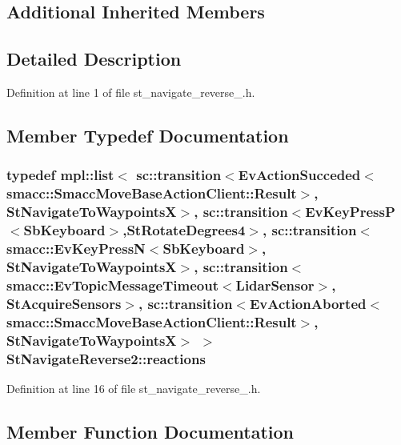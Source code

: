\subsection*{Additional Inherited Members}


\subsection{Detailed Description}


Definition at line 1 of file st\+\_\+navigate\+\_\+reverse\+\_.\+h.



\subsection{Member Typedef Documentation}
\subsubsection[{\texorpdfstring{reactions}{reactions}}]{\setlength{\rightskip}{0pt plus 5cm}typedef mpl\+::list$<$ sc\+::transition$<$Ev\+Action\+Succeded$<$smacc\+::\+Smacc\+Move\+Base\+Action\+Client\+::\+Result$>$, {\bf St\+Navigate\+To\+WaypointsX}$>$, sc\+::transition$<$Ev\+Key\+PressP$<$Sb\+Keyboard$>$,{\bf St\+Rotate\+Degrees4}$>$, sc\+::transition$<${\bf smacc\+::\+Ev\+Key\+PressN}$<$Sb\+Keyboard$>$, {\bf St\+Navigate\+To\+WaypointsX}$>$, sc\+::transition$<${\bf smacc\+::\+Ev\+Topic\+Message\+Timeout}$<${\bf Lidar\+Sensor}$>$, {\bf St\+Acquire\+Sensors}$>$, sc\+::transition$<$Ev\+Action\+Aborted$<$smacc\+::\+Smacc\+Move\+Base\+Action\+Client\+::\+Result$>$, {\bf St\+Navigate\+To\+WaypointsX}$>$ $>$ {\bf St\+Navigate\+Reverse2\+::reactions}}\hypertarget{structStNavigateReverse2_a1a38b381a26ffbaa5f9dc81cd604c3b6}{}\label{structStNavigateReverse2_a1a38b381a26ffbaa5f9dc81cd604c3b6}


Definition at line 16 of file st\+\_\+navigate\+\_\+reverse\+\_.\+h.



\subsection{Member Function Documentation}
